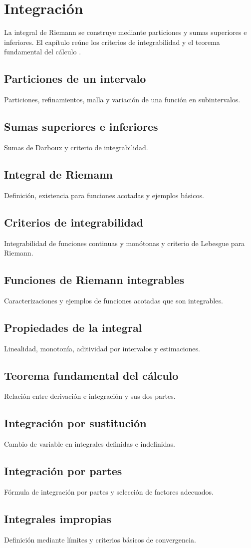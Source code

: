 \chapter{Integración}
\label{cap:integracion}

La integral de Riemann se construye mediante particiones y sumas superiores e inferiores. El capítulo reúne los criterios de integrabilidad y el teorema fundamental del cálculo \cite{apostol1974,spivak2008,rudin1976}.

\section{Particiones de un intervalo}
Particiones, refinamientos, malla y variación de una función en subintervalos.

\section{Sumas superiores e inferiores}
Sumas de Darboux y criterio de integrabilidad.

\section{Integral de Riemann}
Definición, existencia para funciones acotadas y ejemplos básicos.

\section{Criterios de integrabilidad}
Integrabilidad de funciones continuas y monótonas y criterio de Lebesgue para Riemann.

\section{Funciones de Riemann integrables}
Caracterizaciones y ejemplos de funciones acotadas que son integrables.

\section{Propiedades de la integral}
Linealidad, monotonía, aditividad por intervalos y estimaciones.

\section{Teorema fundamental del cálculo}
Relación entre derivación e integración y sus dos partes.

\section{Integración por sustitución}
Cambio de variable en integrales definidas e indefinidas.

\section{Integración por partes}
Fórmula de integración por partes y selección de factores adecuados.

\section{Integrales impropias}
Definición mediante límites y criterios básicos de convergencia.
